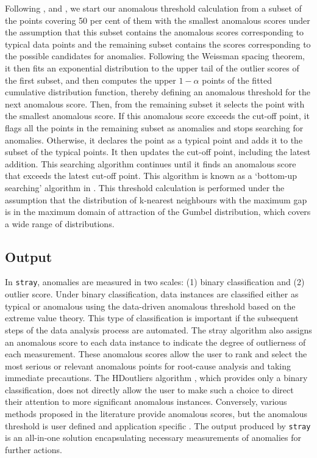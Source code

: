 \documentclass[11pt,a4paper,]{article}
\theoremstyle{definition}
\theoremstyle{definition}
\theoremstyle{definition}
\theoremstyle{remark}
\begin{document}
Following \textcite{schwarz2008wind}, \textcite{burridge2006additive} and \textcite{wilkinson2017visualizing}, we start our anomalous threshold calculation from a subset of the points covering 50 per cent of them with the smallest anomalous scores under the assumption that this subset contains the anomalous scores corresponding to typical data points and the remaining subset contains the scores corresponding to the possible
candidates for anomalies. Following the Weissman spacing theorem, it then fits an exponential distribution to the upper tail of the outlier scores of the first subset, and then computes the upper \(1- \alpha\) points of the fitted cumulative distribution function, thereby defining
an anomalous threshold for the next anomalous score. Then, from the remaining subset it selects the point with the smallest anomalous score. If this anomalous score exceeds the cut-off point, it flags all the
points in the remaining subset as anomalies and stops searching for anomalies. Otherwise, it declares the point as a typical point and adds it to the subset of the typical points. It then updates the cut-off
point, including the latest addition. This searching algorithm continues until it finds an anomalous score that exceeds the latest cut-off point. This algorithm is known as a `bottom-up searching'
algorithm in \textcite{schwarz2008wind}. This threshold calculation is performed under the assumption that the distribution of k-nearest neighbours with the maximum gap is in the maximum domain of attraction of the Gumbel distribution, which covers a wide range of distributions.

\hypertarget{output}{%
\subsection{Output}\label{output}}

In \texttt{stray}, anomalies are measured in two scales: (1) binary classification and (2) outlier score. Under binary classification, data instances are classified either as typical or anomalous using the data-driven anomalous threshold based on the extreme value theory. This type of classification is important if the subsequent steps of the data analysis process are automated. The stray algorithm also assigns an anomalous score to each data instance to indicate the degree of outlierness of each measurement. These anomalous scores allow the user to rank and select the most serious or relevant anomalous points for root-cause analysis and taking immediate precautions. The HDoutliers algorithm \autocite{wilkinson2017visualizing}, which provides only a binary classification, does not directly allow the user to make such a choice to direct their attention to more significant anomalous instances. Conversely, various methods proposed in the literature provide anomalous scores, but the anomalous threshold is user defined and application specific \autocite{madsen2018ddoutlier}. The output produced by \texttt{stray} is an all-in-one solution
encapsulating necessary measurements of anomalies for further actions.
\end{document}
